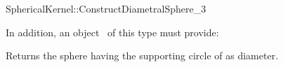 \begin{ccRefFunctionObjectConcept}{SphericalKernel::ConstructDiametralSphere_3}

\ccRefines



In addition, an object \ccVar\ of this type must provide:

{Returns the sphere having the supporting circle of  as diameter.}

\end{ccRefFunctionObjectConcept}
